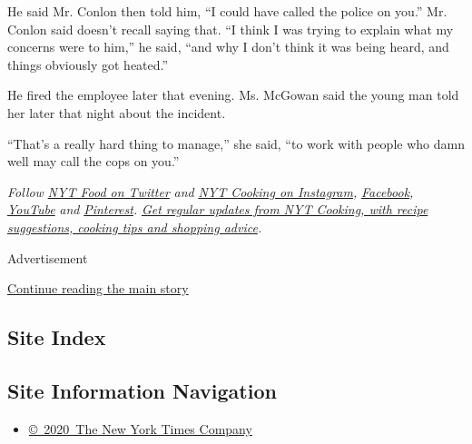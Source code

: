 He said Mr. Conlon then told him, ``I could have called the police on
you.'' Mr. Conlon said doesn't recall saying that. ``I think I was
trying to explain what my concerns were to him,'' he said, ``and why I
don't think it was being heard, and things obviously got heated.''

He fired the employee later that evening. Ms. McGowan said the young man
told her later that night about the incident.

``That's a really hard thing to manage,'' she said, ``to work with
people who damn well may call the cops on you.''

\emph{Follow} \href{https://twitter.com/nytfood}{\emph{NYT Food on
Twitter}} \emph{and}
\href{https://www.instagram.com/nytcooking/}{\emph{NYT Cooking on
Instagram}}\emph{,}
\href{https://www.facebookcorewwwi.onion/nytcooking/}{\emph{Facebook}}\emph{,}
\href{https://www.youtube.com/nytcooking}{\emph{YouTube}} \emph{and}
\href{https://www.pinterest.com/nytcooking/}{\emph{Pinterest}}\emph{.}
\href{https://www.nytimes3xbfgragh.onion/newsletters/cooking}{\emph{Get
regular updates from NYT Cooking, with recipe suggestions, cooking tips
and shopping advice}}\emph{.}

Advertisement

\protect\hyperlink{after-bottom}{Continue reading the main story}

\hypertarget{site-index}{%
\subsection{Site Index}\label{site-index}}

\hypertarget{site-information-navigation}{%
\subsection{Site Information
Navigation}\label{site-information-navigation}}

\begin{itemize}
\tightlist
\item
  \href{https://help.nytimes3xbfgragh.onion/hc/en-us/articles/115014792127-Copyright-notice}{©~2020~The
  New York Times Company}
\end{itemize}


